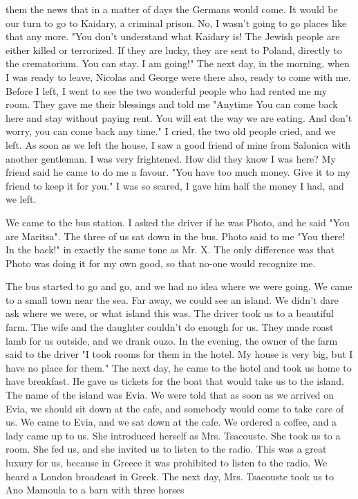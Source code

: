them the news that in a matter of days the Germans would come. It would 
be our turn to go to Kaidary, a criminal prison. No, I wasn't going to 
go places like that any more. "You don't understand what Kaidary is! 
The Jewish people are either killed or terrorized. If they are lucky, 
they are sent to Poland, directly to the crematorium. You can stay. I 
am going!" 
The next day, in the morning, when I was ready to leave, Nicolas and 
George were there also, ready to come with me. Before I left, I went 
to see the two wonderful people who had rented me my room. They gave 
me their blessings and told me "Anytime You can come back here and stay without paying rent. You will eat the way we are eating. And don't worry, you can come back any time." I cried, the two old people cried, and we left. 
As soon as we left the house, I saw a good friend of mine from Salonica with another gentleman. I was very frightened. How did they know I was here? My friend said he came to do me a favour. "You have too much money. Give it to my friend to keep it for you." I was so 
scared, I gave him half the money I had, and we left. 

We came to the bus station. I asked the driver if he was Photo, 
and he said "You are Maritsa". The three of us sat down in the bus. 
Photo said to me "You there! In the back!" in exactly the same tone as 
Mr. X. The only difference was that Photo was doing it for my own good, 
so that no-one would recognize me. 

The bus started to go and go, and we had no idea where we were going. We came to a small town near the sea. Far away, we could see an island. We didn't dare ask where we were, or what island this was. The driver took us to a beautiful farm. The wife and the daughter couldn't 
do enough for us. They made roast lamb for us outside, and we drank 
ouzo. In the evening, the owner of the farm said to the driver "I took 
rooms for them in the hotel. My house is very big, but I have no place 
for them." The next day, he came to the hotel and took us home to have 
breakfast. He gave us tickets for the boat that would take us to the 
island. The name of the island was Evia. We were told that as soon as 
we arrived on Evia, we should sit down at the cafe, and somebody would 
come to take care of us. 
We came to Evia, and we sat down at the cafe. We ordered a coffee, 
and a lady came up to us. She introduced herself as Mrs. Tsacouste. She
took us to a room. She fed us, and she invited us to listen to the radio. 
This was a great luxury for us, because in Greece it was prohibited to 
listen to the radio. We heard a London broadcast in Greek. The next 
day, Mrs. Tsacouste took us to Ano Mamoula to a barn with three horses 

